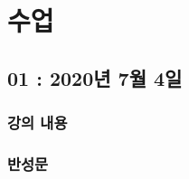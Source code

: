 \documentclass[12pt, a4paper, oneside]{book}
\let\stdsection\section
\renewcommand\section{\newpage\stdsection}
\begin{document}
	\chapter{수업}
	\noptcrule

	\newpage	
	\minitoc




	\section{ 01 : 2020년 7월 4일 }

		\subsection{ 강의 내용}

		\subsection{ 반성문}













\end{document}
